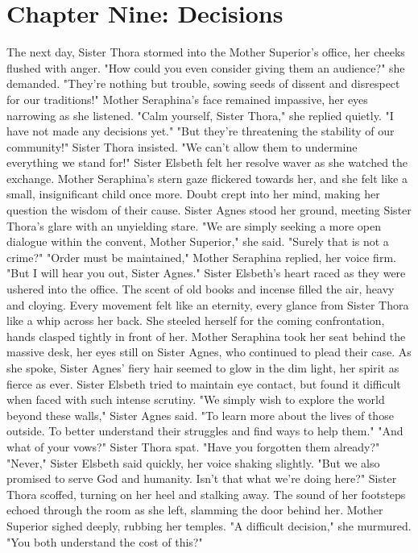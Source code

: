 \documentclass[11pt]{article}
\begin{document}
\section{Chapter Nine: Decisions}
\label{sec:org17629be}
The next day, Sister Thora stormed into the Mother Superior's office, her cheeks flushed with anger. "How could you even consider giving them an audience?" she demanded. "They're nothing but trouble, sowing seeds of dissent and disrespect for our traditions!"
Mother Seraphina's face remained impassive, her eyes narrowing as she listened. "Calm yourself, Sister Thora," she replied quietly. "I have not made any decisions yet."
"But they're threatening the stability of our community!" Sister Thora insisted. "We can't allow them to undermine everything we stand for!"
Sister Elsbeth felt her resolve waver as she watched the exchange. Mother Seraphina's stern gaze flickered towards her, and she felt like a small, insignificant child once more. Doubt crept into her mind, making her question the wisdom of their cause.
Sister Agnes stood her ground, meeting Sister Thora's glare with an unyielding stare. "We are simply seeking a more open dialogue within the convent, Mother Superior," she said. "Surely that is not a crime?"
"Order must be maintained," Mother Seraphina replied, her voice firm. "But I will hear you out, Sister Agnes."
Sister Elsbeth's heart raced as they were ushered into the office. The scent of old books and incense filled the air, heavy and cloying. Every movement felt like an eternity, every glance from Sister Thora like a whip across her back. She steeled herself for the coming confrontation, hands clasped tightly in front of her.
Mother Seraphina took her seat behind the massive desk, her eyes still on Sister Agnes, who continued to plead their case. As she spoke, Sister Agnes' fiery hair seemed to glow in the dim light, her spirit as fierce as ever. Sister Elsbeth tried to maintain eye contact, but found it difficult when faced with such intense scrutiny.
"We simply wish to explore the world beyond these walls," Sister Agnes said. "To learn more about the lives of those outside. To better understand their struggles and find ways to help them."
"And what of your vows?" Sister Thora spat. "Have you forgotten them already?"
"Never," Sister Elsbeth said quickly, her voice shaking slightly. "But we also promised to serve God and humanity. Isn't that what we're doing here?"
Sister Thora scoffed, turning on her heel and stalking away. The sound of her footsteps echoed through the room as she left, slamming the door behind her.
Mother Superior sighed deeply, rubbing her temples. "A difficult decision," she murmured. "You both understand the cost of this?"
\end{document}
